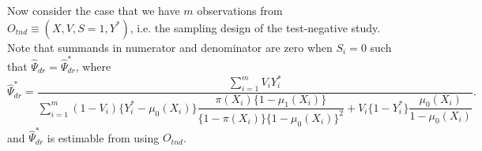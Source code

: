 Now consider the case that we have $m$ observations from $O_{tnd} \equiv (X, V, S=1, Y^*)$, i.e. the sampling design of the test-negative study. Note that summands in numerator and denominator are zero when $S_i=0$ such that $\widehat{\Psi}_{dr} = \widehat{\Psi}^*_{dr}$, where
\begin{equation*}
    \widehat{\Psi}^*_{dr} = \dfrac{\sum_{i=1}^{m}  V_i Y_i^*}{\sum_{i=1}^m(1 - V_i)\{Y_i^* - \mu_0(X_i)\}\dfrac{\pi(X_i)\{1 - \mu_1(X_i)\}}{\{1 - \pi(X_i)\}\{1 - \mu_0(X_i)\}^2} + V_i\{1-Y_i^*\}\dfrac{\mu_0(X_i)}{1 - \mu_0(X_i)}}.
\end{equation*}
and $\widehat{\Psi}^*_{dr}$ is estimable from using $O_{tnd}$.

